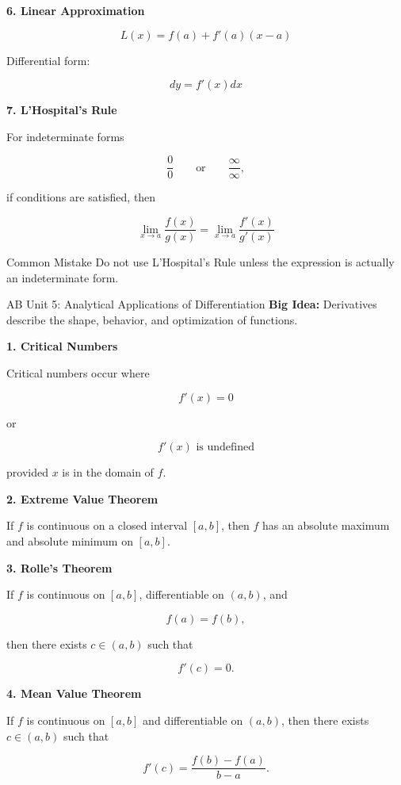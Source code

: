 \documentclass[11pt]{article}
\newcommand{\subtopic}[1]{
\vspace{0.45em}
\textcolor{novelPurpleDark}{\textbf{#1}}
}
\begin{document}
\subtopic{6. Linear Approximation}

\[
L(x)=f(a)+f'(a)(x-a)
\]

Differential form:

\[
dy=f'(x)dx
\]

\subtopic{7. L'Hospital's Rule}

For indeterminate forms

\[
\frac00
\qquad\text{or}\qquad
\frac{\infty}{\infty},
\]

if conditions are satisfied, then

\[
\lim_{x\to a}\frac{f(x)}{g(x)}
=
\lim_{x\to a}\frac{f'(x)}{g'(x)}
\]

\begin{warningbox}{Common Mistake}
Do not use L'Hospital's Rule unless the expression is actually an indeterminate form.
\end{warningbox}

\newpage

\begin{unitbox}{AB Unit 5: Analytical Applications of Differentiation}
\textbf{Big Idea:} Derivatives describe the shape, behavior, and optimization of functions.
\end{unitbox}

\subtopic{1. Critical Numbers}

Critical numbers occur where

\[
f'(x)=0
\]

or

\[
f'(x)\text{ is undefined}
\]

provided \(x\) is in the domain of \(f\).

\subtopic{2. Extreme Value Theorem}

If \(f\) is continuous on a closed interval \([a,b]\), then \(f\) has an absolute maximum and absolute minimum on \([a,b]\).

\subtopic{3. Rolle's Theorem}

If \(f\) is continuous on \([a,b]\), differentiable on \((a,b)\), and

\[
f(a)=f(b),
\]

then there exists \(c\in(a,b)\) such that

\[
f'(c)=0.
\]

\subtopic{4. Mean Value Theorem}

If \(f\) is continuous on \([a,b]\) and differentiable on \((a,b)\), then there exists \(c\in(a,b)\) such that

\[
f'(c)=\frac{f(b)-f(a)}{b-a}.
\]
\end{document}
